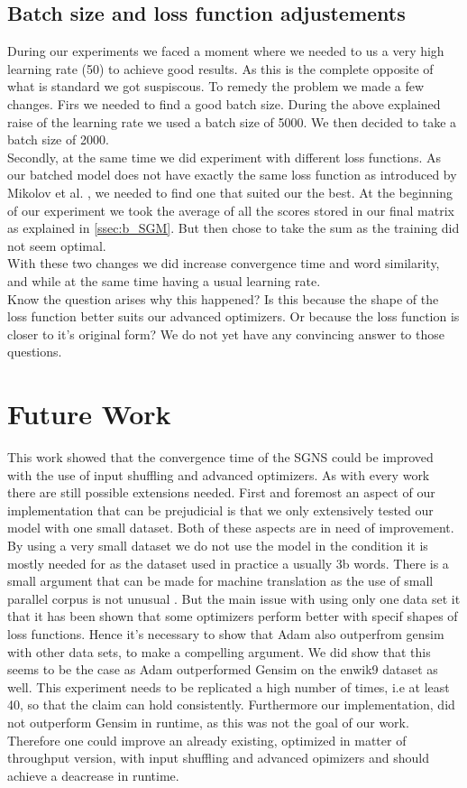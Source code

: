 \subsection{Batch size and loss function adjustements}\label{ssec:bs_lf}
During our experiments we faced a moment where we needed to us a very high learning rate (50) to achieve good results. As this is the complete opposite of what is standard we got suspiscous. To remedy the problem we made a few changes. 
Firs we needed to find a good batch size. During the above explained raise of the learning rate we used a batch size of 5000. We then decided to take a batch size of 2000.\\
 Secondly, at the same time we did experiment with different loss functions. As our batched model does not have exactly the same loss function as introduced by Mikolov et al. \cite{mikolov}, we needed to find one that suited  our the best. At the beginning of our experiment we took the average of all the scores stored in our final matrix as explained in \ref{ssec:b_SGM}. But then chose to take the sum as the training did not seem optimal.\\ 
 With these two changes we did increase convergence time and word similarity, and while at the same time having a usual learning rate. \\
 Know the question arises why this happened? Is this because the shape of the loss function better suits our advanced optimizers. Or because the loss function is closer to it's original form? We do not yet have any convincing answer to those questions.


\section{Future Work}
This work showed that the convergence time of the SGNS could be improved with the use of input shuffling and advanced optimizers. As with every work there are still possible extensions needed. First and foremost an aspect of our implementation that can be prejudicial is that we only extensively tested our model with one small dataset. Both of these aspects are in need of improvement. By using a very small dataset we do not use the model in the condition it is mostly needed for as the dataset used in practice a usually 3b words. There is a small argument that can be made for machine translation as the use of small parallel corpus is not unusual . But the main issue with using only one data set it that it has been shown that some optimizers perform better with specif shapes of loss functions. Hence it's necessary to show that Adam also outperfrom gensim with other data sets, to make a compelling argument. We did show that this seems to be the case as Adam outperformed Gensim on the enwik9 dataset as well. This experiment needs to be replicated a high number of times, i.e at least 40, so that the claim can hold consistently.
Furthermore our implementation, did not outperform Gensim in runtime, as this was not the goal of our work. Therefore one could improve an already existing, optimized in matter of throughput version, with input shuffling and advanced opimizers and should achieve a deacrease in runtime. 
